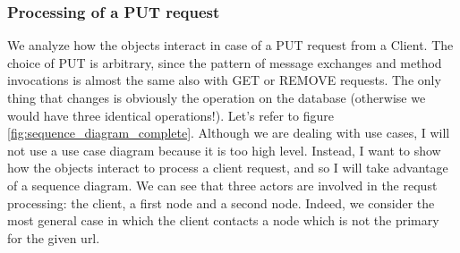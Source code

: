 \documentclass{article}
\begin{document}
\subsubsection{Processing of a PUT request} 
We analyze how the objects interact in case of a PUT request from a Client. The choice of PUT is arbitrary, since the pattern of message exchanges and method invocations is almost the same also with GET or REMOVE requests. The only thing that changes is obviously the operation on the database (otherwise we would have three identical operations!).
Let's refer to figure \ref{fig:sequence_diagram_complete}. Although we are dealing with use cases, I will not use a use case diagram because it is too high level. Instead, I want to show how the objects interact to process a client request, and so I will take advantage of a sequence diagram. We can see that three actors are involved in the requst processing: the client, a first node and a second node. Indeed, we consider the most general case in which the client contacts a node which is not the primary for the given url.
\end{document}

